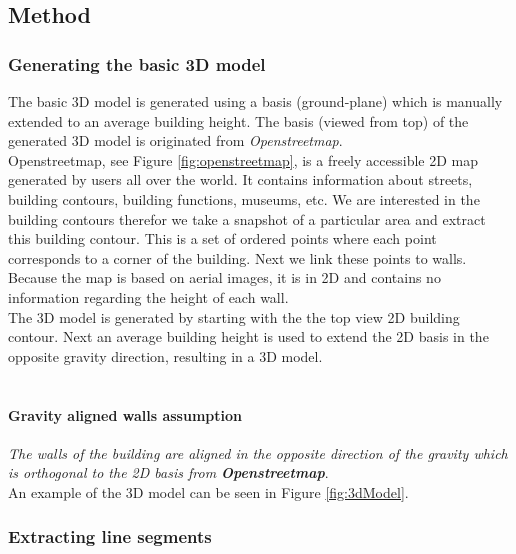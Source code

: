 \subsection{Method}

\subsubsection{Generating the basic 3D model}
The basic 3D model is generated using a basis (ground-plane) which is manually extended
to an average building height.  The basis (viewed from top) of the generated 3D model is originated from
\emph{Openstreetmap}.\\
Openstreetmap, see Figure \ref{fig:openstreetmap}, is a freely accessible 2D map generated by
users all over the world. It contains information about streets, building
contours, building functions, museums, etc.  We are interested in the building
contours therefor we take a snapshot of a particular area and extract this building
contour.  This is a set of ordered points where each point corresponds to a
corner of the building.  Next we link these points to walls.
Because the map is based on aerial images, it is in 2D and contains no
information regarding the height of each wall.  \\
The 3D model is generated by starting with the the top view 2D building contour.
Next an average building height is used to extend the 2D basis in the opposite gravity direction,
resulting in a 3D model.\\\\
\paragraph{Gravity aligned walls assumption}
	\emph{The walls of the building are aligned in the opposite direction of the gravity
	which is orthogonal to the 2D basis from \textbf{Openstreetmap}}.\\

An example of the 3D model can be seen in Figure
\ref{fig:3dModel}.



\subsubsection{Extracting line segments}
\label{extractinglinesegments}

